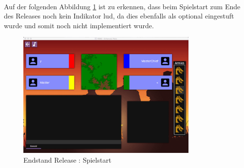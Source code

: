 \documentclass[12pt, titlepage]{scrartcl}
\newcommand{\RN}[1]{%
	\textup{\uppercase\expandafter{\romannumeral#1}}%
}
\begin{document}
			\ \\ Auf der folgenden Abbildung \ref{End_Game_Start} ist zu erkennen, dass beim Spielstart zum Ende des Releases noch kein Indikator lud, da dies ebenfalls als optional eingestuft wurde und somit noch nicht implementiert wurde.
			\begin{figure}[H] 
				\centering
				\includegraphics[width=0.8\textwidth]{images/endOfRelease/StartGame.png}
				\caption{Endstand Release \RN{3}: Spielstart}
				\label{End_Game_Start}
			\end{figure}
\end{document}
